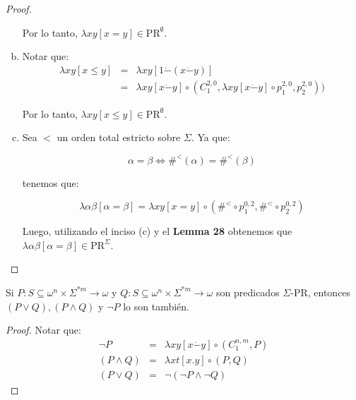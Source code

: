 \begin{proof}
\begin{enumerate}[a)]
        \PN Por lo tanto, $\lambda xy \left[x=y\right] \in \mathrm{PR}^{\emptyset}$.

      \item Notar que:
        \begin{eqnarray*}
          \lambda xy \left[x \leq y\right] &=& \lambda xy\left[1 \dot{-}(x \dot{-}y)\right] \\
          &=& \lambda xy \left[x \dot{-}y\right] \circ (C_{1}^{2,0}, \lambda xy \left[x \dot{-}y\right] \circ
            p_{1}^{2,0}, p_{2}^{2,0}))
        \end{eqnarray*}

        \PN Por lo tanto, $\lambda xy \left[x \leq y\right] \in \mathrm{PR}^{\emptyset}$.

      \item Sea $<$ un orden total estricto sobre $\Sigma$. Ya que:

        \[
          \alpha = \beta \Leftrightarrow \#^{<}(\alpha) = \#^{<}(\beta)
        \]

        \PN tenemos que:

        \[
          \lambda \alpha\beta \left[\alpha=\beta\right] = \lambda xy \left[x=y\right] \circ (\#^{<} \circ p_{1}^{0,2},
          \#^{<} \circ p_{2}^{0,2})
        \]

        \PN Luego, utilizando el inciso (c) y el \textbf{Lemma 28} obtenemos que $\lambda \alpha\beta
        \left[\alpha=\beta\right] \in \mathrm{PR}^{\Sigma}$.
    \end{enumerate}
  \end{proof}

  \begin{lemma}
    \PN Si $P: S \subseteq \omega^{n} \times \Sigma^{\ast m} \rightarrow \omega$ y $Q: S \subseteq \omega^{n} \times
    \Sigma^{\ast m} \rightarrow \omega$ son predicados $\Sigma$-PR, entonces $(P \vee Q), (P \wedge Q)$ y $\neg P$ lo
    son también.
  \end{lemma}
  \begin{proof}
    \PN Notar que:
    \begin{eqnarray*}
      \neg P &=& \lambda xy \left[x \dot{-} y\right] \circ (C_{1}^{n, m}, P) \\
      (P \wedge Q) &=& \lambda xt \left[x.y\right] \circ (P, Q) \\
      (P \vee Q) &=& \neg (\neg P \wedge \neg Q)
    \end{eqnarray*}
  \end{proof}

